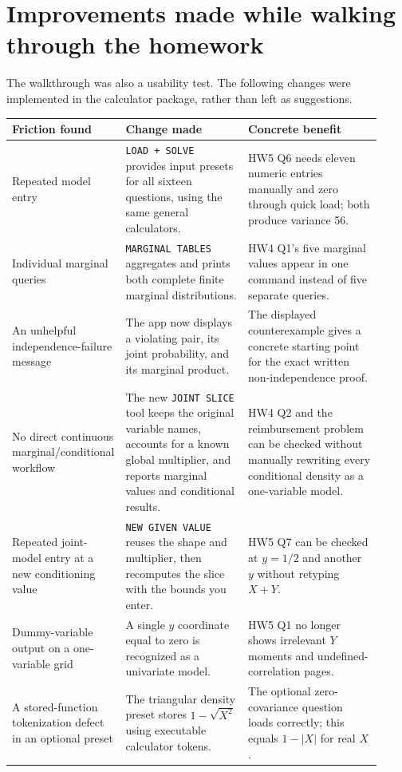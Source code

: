 \section{Improvements made while walking through the homework}
The walkthrough was also a usability test. The following changes were implemented in the calculator package, rather than left as suggestions.

\begin{longtable}{@{}>{\raggedright\arraybackslash}p{0.21\linewidth}>{\raggedright\arraybackslash}p{0.34\linewidth}>{\raggedright\arraybackslash}p{0.37\linewidth}@{}}
\toprule Friction found & Change made & Concrete benefit\\\midrule\endhead
Repeated model entry & \texttt{LOAD + SOLVE} provides input presets for all sixteen questions, using the same general calculators. & HW5 Q6 needs eleven numeric entries manually and zero through quick load; both produce variance 56.\\
Individual marginal queries & \texttt{MARGINAL TABLES} aggregates and prints both complete finite marginal distributions. & HW4 Q1's five marginal values appear in one command instead of five separate queries.\\
An unhelpful independence-failure message & The app now displays a violating pair, its joint probability, and its marginal product. & The displayed counterexample gives a concrete starting point for the exact written non-independence proof.\\
No direct continuous marginal/conditional workflow & The new \texttt{JOINT SLICE} tool keeps the original variable names, accounts for a known global multiplier, and reports marginal values and conditional results. & HW4 Q2 and the reimbursement problem can be checked without manually rewriting every conditional density as a one-variable model.\\
Repeated joint-model entry at a new conditioning value & \texttt{NEW GIVEN VALUE} reuses the shape and multiplier, then recomputes the slice with the bounds you enter. & HW5 Q7 can be checked at $y=1/2$ and another $y$ without retyping $X+Y$.\\
Dummy-variable output on a one-variable grid & A single $y$ coordinate equal to zero is recognized as a univariate model. & HW5 Q1 no longer shows irrelevant $Y$ moments and undefined-correlation pages.\\
A stored-function tokenization defect in an optional preset & The triangular density preset stores $1-\sqrt{X^2}$ using executable calculator tokens. & The optional zero-covariance question loads correctly; this equals $1-|X|$ for real $X$.\\\bottomrule
\end{longtable}

